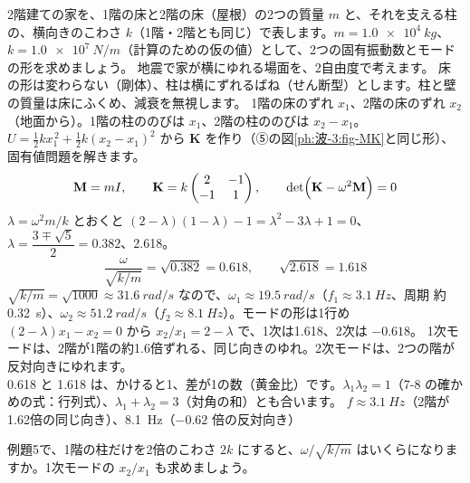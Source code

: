 \label{ph:波-3:ex5}
\begin{phreidai}
2階建ての家を、1階の床と2階の床（屋根）の2つの質量 $m$ と、それを支える柱の、横向きのこわさ $k$（1階・2階とも同じ）で表します。$m=\qty{1.0e4}{kg}$、$k=\qty{1.0e7}{N/m}$（計算のための仮の値）として、2つの固有振動数とモードの形を求めましょう。
\phbamen
地震で家が横にゆれる場面を、2自由度で考えます。
\phmushi
床の形は変わらない（剛体）、柱は横にずれるばね（せん断型）とします。柱と壁の質量は床にふくめ、減衰を無視します。
\phzu
1階の床のずれ $x_1$、2階の床のずれ $x_2$（地面から）。1階の柱ののびは $x_1$、2階の柱ののびは $x_2-x_1$。
\phriyu
$U=\tfrac12kx_1^{\,2}+\tfrac12k(x_2-x_1)^2$ から $\mathbf K$ を作り（⑤の図\ref{ph:波-3:fig-MK}と同じ形）、固有値問題を解きます。
\phtateru
\[\mathbf M=mI,\qquad\mathbf K=k\begin{pmatrix}2&-1\\-1&1\end{pmatrix},\qquad\det\Bigl(\mathbf K-\omega^2\mathbf M\Bigr)=0\]
\phtoku
$\lambda=\omega^2m/k$ とおくと $(2-\lambda)(1-\lambda)-1=\lambda^2-3\lambda+1=0$、$\lambda=\dfrac{3\mp\sqrt5}{2}=0.382$、2.618。
\[\frac{\omega}{\sqrt{k/m}}=\sqrt{0.382}=0.618,\qquad\sqrt{2.618}=1.618\]
$\sqrt{k/m}=\sqrt{1000}\approx\qty{31.6}{rad/s}$ なので、$\omega_1\approx\qty{19.5}{rad/s}$（$f_1\approx\qty{3.1}{Hz}$、周期 約\qty{0.32}{s}）、$\omega_2\approx\qty{51.2}{rad/s}$（$f_2\approx\qty{8.1}{Hz}$）。モードの形は1行め $(2-\lambda)x_1-x_2=0$ から $x_2/x_1=2-\lambda$ で、1次は1.618、2次は $-0.618$。
\phtashikame
1次モードは、2階が1階の約1.6倍ずれる、同じ向きのゆれ。2次モードは、2つの階が反対向きにゆれます。\\
0.618 と 1.618 は、かけると1、差が1の数（黄金比）です。$\lambda_1\lambda_2=1$（7-8 の確かめの式：行列式）、$\lambda_1+\lambda_2=3$（対角の和）とも合います。
\kotae $f\approx\qty{3.1}{Hz}$（2階が1.62倍の同じ向き）、\qty{8.1}{Hz}（$-0.62$ 倍の反対向き）
\end{phreidai}
\begin{jibun}
例題5で、1階の柱だけを2倍のこわさ $2k$ にすると、$\omega/\sqrt{k/m}$ はいくらになりますか。1次モードの $x_2/x_1$ も求めましょう。
\end{jibun}


